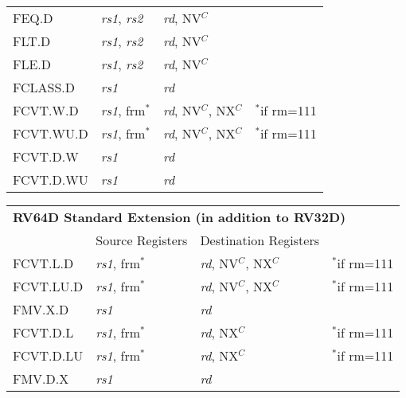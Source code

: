 \begin{tabular}{p{25mm}|p{3cm}|p{6cm}|p{10cm}}
   \cline{2-3}
   FEQ.D & {\em rs1}, {\em rs2} & {\em rd}, NV$^C$ &  \\
   \cline{2-3}
   FLT.D & {\em rs1}, {\em rs2} & {\em rd}, NV$^C$ &  \\
   \cline{2-3}
   FLE.D & {\em rs1}, {\em rs2} & {\em rd}, NV$^C$ &  \\
   \cline{2-3}
   FCLASS.D & {\em rs1} & {\em rd} &  \\
   \cline{2-3}
   FCVT.W.D & {\em rs1}, frm$^*$ & {\em rd}, NV$^C$, NX$^C$ & $^*$if rm=111 \\
   \cline{2-3}
   FCVT.WU.D & {\em rs1}, frm$^*$ & {\em rd}, NV$^C$, NX$^C$ & $^*$if rm=111 \\
   \cline{2-3}
   FCVT.D.W & {\em rs1} & {\em rd} & \\
   \cline{2-3}
   FCVT.D.WU & {\em rs1} & {\em rd} & \\
   \cline{2-3}
\end{tabular}

\begin{tabular}{p{25mm}|p{3cm}|p{6cm}|p{10cm}}
  \multicolumn{4}{l}{\bf RV64D Standard Extension (in addition to RV32D)} \\
  \cline{2-3}
   & Source Registers & Destination Registers \\
  \cline{2-3}
   FCVT.L.D & {\em rs1}, frm$^*$ & {\em rd}, NV$^C$, NX$^C$ & $^*$if rm=111 \\
   \cline{2-3}
   FCVT.LU.D & {\em rs1}, frm$^*$ & {\em rd}, NV$^C$, NX$^C$ & $^*$if rm=111 \\
   \cline{2-3}
   FMV.X.D & {\em rs1} & {\em rd} &  \\
   \cline{2-3}
   FCVT.D.L & {\em rs1}, frm$^*$ & {\em rd}, NX$^C$ & $^*$if rm=111 \\
   \cline{2-3}
   FCVT.D.LU & {\em rs1}, frm$^*$ & {\em rd}, NX$^C$ & $^*$if rm=111 \\
   \cline{2-3}
   FMV.D.X & {\em rs1} & {\em rd} &  \\
   \cline{2-3}
\end{tabular}

